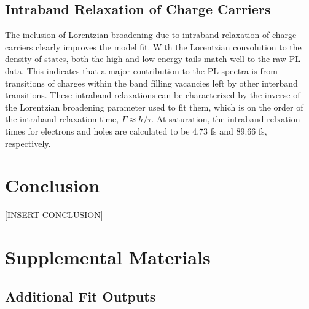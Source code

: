\documentclass[aps,prb,preprint,groupedaddress]{revtex4-2}
\begin{document}
\subsection{Intraband Relaxation of Charge Carriers}

The inclusion of Lorentzian broadening due to intraband relaxation of charge carriers clearly improves the model fit. With the Lorentzian convolution to the density of states, both the high and low energy tails match well to the raw PL data. This indicates that a major contribution to the PL spectra is from transitions of charges within the band filling vacancies left by other interband transitions. These intraband relaxations can be characterized by the inverse of the Lorentzian broadening parameter used to fit them, which is on the order of the intraband relaxation time, $\Gamma \approx \hbar/\tau$. At saturation, the intraband relxation times for electrons and holes are calculated to be 4.73 fs and 89.66 fs, respectively.





\section{Conclusion}


[INSERT CONCLUSION]



\clearpage

\section{Supplemental Materials}

\subsection{Additional Fit Outputs}
\end{document}
